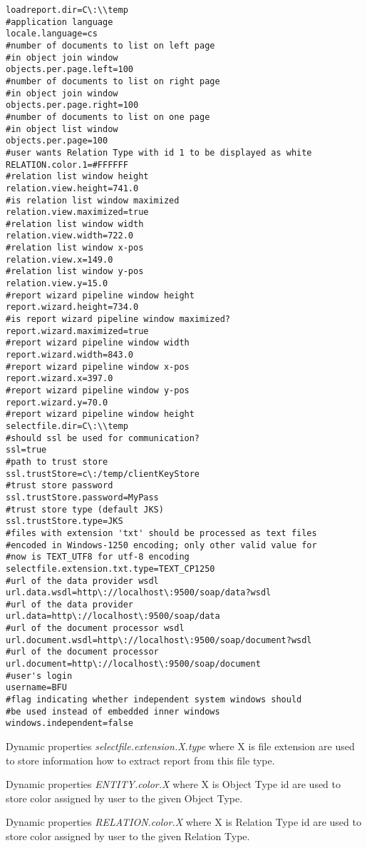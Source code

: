\begin{lstlisting}[frame=single,language=properties]
loadreport.dir=C\:\\temp
#application language
locale.language=cs
#number of documents to list on left page
#in object join window
objects.per.page.left=100
#number of documents to list on right page
#in object join window
objects.per.page.right=100
#number of documents to list on one page
#in object list window
objects.per.page=100
#user wants Relation Type with id 1 to be displayed as white
RELATION.color.1=#FFFFFF
#relation list window height
relation.view.height=741.0
#is relation list window maximized
relation.view.maximized=true
#relation list window width
relation.view.width=722.0
#relation list window x-pos
relation.view.x=149.0
#relation list window y-pos
relation.view.y=15.0
#report wizard pipeline window height
report.wizard.height=734.0
#is report wizard pipeline window maximized?
report.wizard.maximized=true
#report wizard pipeline window width
report.wizard.width=843.0
#report wizard pipeline window x-pos
report.wizard.x=397.0
#report wizard pipeline window y-pos
report.wizard.y=70.0
#report wizard pipeline window height
selectfile.dir=C\:\\temp
#should ssl be used for communication?
ssl=true
#path to trust store
ssl.trustStore=c\:/temp/clientKeyStore
#trust store password
ssl.trustStore.password=MyPass
#trust store type (default JKS)
ssl.trustStore.type=JKS
#files with extension 'txt' should be processed as text files
#encoded in Windows-1250 encoding; only other valid value for
#now is TEXT_UTF8 for utf-8 encoding
selectfile.extension.txt.type=TEXT_CP1250
#url of the data provider wsdl
url.data.wsdl=http\://localhost\:9500/soap/data?wsdl
#url of the data provider
url.data=http\://localhost\:9500/soap/data
#url of the document processor wsdl
url.document.wsdl=http\://localhost\:9500/soap/document?wsdl
#url of the document processor
url.document=http\://localhost\:9500/soap/document
#user's login
username=BFU
#flag indicating whether independent system windows should
#be used instead of embedded inner windows
windows.independent=false
\end{lstlisting}

Dynamic properties \emph{selectfile.extension.X.type} where X is file extension
are used to store information how to extract report from this file type.

Dynamic properties \emph{ENTITY.color.X} where X is Object Type id are used to
store color assigned by user to the given Object Type.

Dynamic properties \emph{RELATION.color.X} where X is Relation Type id are used
to store color assigned by user to the given Relation Type.
